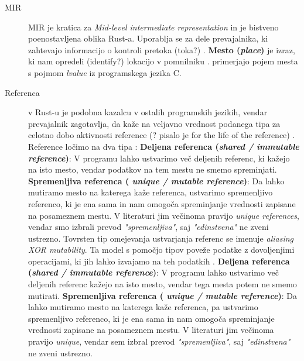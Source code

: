 \documentclass[a4paper,12pt,openright]{book}
\begin{document}
\begin{description}
	\item[MIR] MIR je kratica za \textit{Mid-level intermediate representation} in je bistveno poenostavljena oblika Rust-a.
	      Uporablja se za dele prevajalnika, ki zahtevajo informacijo o kontroli pretoka (toka?) \cite{MIRMidlevelIR}.
	      \subitem \textbf{Mesto (\textit{place})} je izraz, ki nam opredeli (identify?) lokacijo v pomnilniku \cite{MIRMidlevelIR}.
	      \citeauthor{weissOxideEssenceRust2019} primerjajo pojem mesta s pojmom \textit{lvalue} iz programskega jezika C.
	\item[Referenca] v Rust-u je podobna kazalcu v ostalih programskih jezikih, vendar prevajalnik zagotavlja, da kaže
	      na veljavno vrednost podanega tipa za celotno dobo aktivnosti reference (? pisalo je for the life of the reference) \cite{klabnikRustProgrammingLanguage2023}.
	      Reference ločimo na dva tipa \cite{crichtonGroundedConceptualModel2023,yanovskiGhostCellSeparatingPermissions2021,weissOxideEssenceRust2019}:
	      \subitem \textbf{Deljena referenca (\textit{shared / immutable reference})}: V programu lahko ustvarimo več deljenih referenc, ki
	      kažejo na isto mesto, vendar podatkov na tem mestu ne smemo spreminjati.
	      \subitem \textbf{Spremenljiva referenca (\textit{ unique / mutable reference})}: Da lahko mutiramo mesto na katerega kaže
	      referenca, ustvarimo spremenljivo referenco, ki je ena sama in nam omogoča spreminjanje vrednosti zapisane na posameznem mestu.
	      V literaturi jim večinoma pravijo \textit{unique references}, vendar smo izbrali prevod \textit{"spremenljiva"}, saj \textit{"edinstvena"} ne zveni ustrezno.
	      \subitem Tovrsten tip omejevanja ustvarjanja referenc se imenuje \textit{aliasing XOR mutability}. Ta model s pomočjo tipov
	      poveže podatke z dovoljenjimi operacijami, ki jih lahko izvajamo na teh podatkih \cite{yanovskiGhostCellSeparatingPermissions2021}.
	      \subitem \textbf{Deljena referenca (\textit{shared / immutable reference})}: V programu lahko ustvarimo več deljenih referenc
	      kažejo na isto mesto, vendar tega mesta potem ne smemo mutirati.
	      \subitem \textbf{Spremenljiva referenca (\textit{ unique / mutable reference})}: Da lahko mutiramo mesto na katerega kaže
	      referenca, pa ustvarimo spremenljivo referenco, ki je ena sama in nam omogoča spreminjanje vrednosti zapisane na posameznem mestu.
	      V literaturi jim večinoma pravijo \textit{unique}, vendar sem izbral prevod \textit{"spremenljiva"}, saj \textit{"edinstvena"} ne zveni ustrezno.

\end{description}
\end{document}
